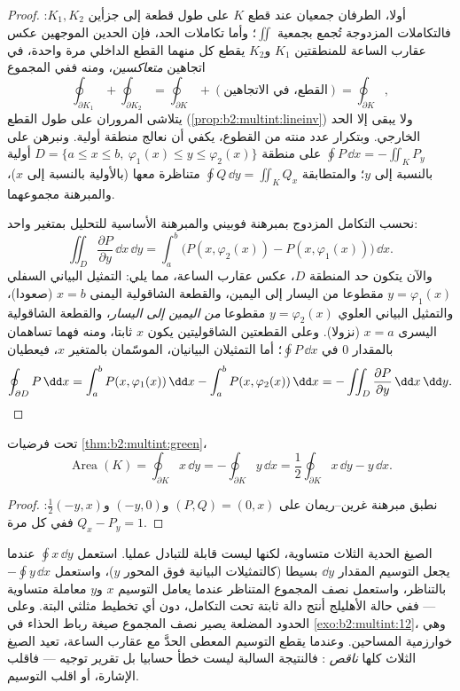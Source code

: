 \begin{proof}
أولا، الطرفان جمعيان عند قطع $K$ على طول قطعة إلى جزأين $K_1, K_2$:
فالتكاملات المزدوجة تُجمع بجمعية $\iint$؛ وأما تكاملات الحد، فإن
الحدين الموجهين عكس عقارب الساعة للمنطقتين $K_1$ و$K_2$ يقطع كل
منهما القطع الداخلي مرة واحدة، في اتجاهين \emph{متعاكسين}، ومنه ففي
المجموع
\[
\oint_{\partial K_1} + \oint_{\partial K_2}
= \oint_{\partial K} + (\text{القطع، في الاتجاهين})
= \oint_{\partial K},
\]
يتلاشى المروران على طول القطع (\cref{prop:b2:multint:lineinv}) ولا يبقى إلا الحد الخارجي.
وبتكرار عدد منته من القطوع، يكفي أن نعالج منطقة أولية. ونبرهن على
$\oint P\,\dd x = -\iint_K P_y$ على منطقة $D = \{a \leq x \leq b,\ \varphi_1(x) \leq y
\leq \varphi_2(x)\}$ أولية بالنسبة إلى $y$؛ والمتطابقة
$\oint Q\,\dd y = \iint_K Q_x$ متناظرة معها (بالأولية بالنسبة إلى $x$)، والمبرهنة
مجموعهما.

نحسب التكامل المزدوج بمبرهنة فوبيني والمبرهنة الأساسية للتحليل
بمتغير واحد:
\[
\iint_D \frac{\partial P}{\partial y}\,\dd x\,\dd y
= \int_a^b \bigl(P(x, \varphi_2(x)) - P(x, \varphi_1(x))\bigr)
\,\dd x .
\]
والآن يتكون حد المنطقة $D$، عكس عقارب الساعة، مما يلي: التمثيل
البياني السفلي $y = \varphi_1(x)$ مقطوعا من اليسار إلى اليمين، والقطعة الشاقولية
اليمنى $x = b$ (صعودا)، والتمثيل البياني العلوي $y =
\varphi_2(x)$ مقطوعا
\emph{من اليمين إلى اليسار}، والقطعة الشاقولية اليسرى $x = a$
(نزولا). وعلى القطعتين الشاقوليتين يكون $x$ ثابتا، ومنه فهما
تساهمان بالمقدار $0$ في $\oint P\,\dd x$؛ أما التمثيلان البيانيان، الموسّمان
بالمتغير $x$، فيعطيان
\[
\oint_{\partial D} P\,\dd x
= \int_a^b P(x, \varphi_1(x))\,\dd x
- \int_a^b P(x, \varphi_2(x))\,\dd x
= -\iint_D \frac{\partial P}{\partial y}\,\dd x\,\dd y .
\qedhere
\]
\end{proof}

\begin{corollary}\label{cor:b2:multint:area}
تحت فرضيات \cref{thm:b2:multint:green}،
\[
\operatorname{Area}(K)
= \oint_{\partial K} x\,\dd y
= -\oint_{\partial K} y\,\dd x
= \frac12\oint_{\partial K} x\,\dd y - y\,\dd x .
\]
\end{corollary}

\begin{proof}
نطبق مبرهنة غرين--ريمان على $(P, Q) = (0, x)$ و$(-y, 0)$ و$\frac12(-y, x)$: ففي كل مرة
$Q_x - P_y = 1$.
\end{proof}

\begin{remark}
الصيغ الحدية الثلاث متساوية، لكنها ليست قابلة للتبادل عمليا. استعمل
$\oint x\,\dd y$ عندما يجعل التوسيم المقدار $\dd y$ بسيطا (كالتمثيلات البيانية
فوق المحور $y$)، واستعمل $-\oint y\,\dd x$ بالتناظر، واستعمل نصف المجموع
المتناظر عندما يعامل التوسيم $x$ و$y$ معاملة متساوية --- ففي
حالة الأهليلج أنتج دالة ثابتة تحت التكامل، دون أي تخطيط مثلثي البتة.
وعلى الحدود المضلعة يصير نصف المجموع صيغة رباط الحذاء في \cref{exo:b2:multint:12}، وهي
خوارزمية المساحين. وعندما يقطع التوسيم المعطى الحدَّ مع عقارب الساعة،
تعيد الصيغ الثلاث كلها \emph{ناقص} : فالنتيجة السالبة ليست
خطأ حسابيا بل تقرير توجيه --- فاقلب الإشارة، أو اقلب التوسيم.
\end{remark}

